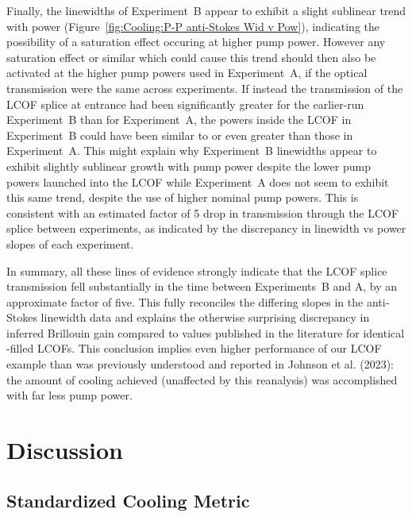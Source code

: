 Finally, the linewidths of Experiment~B appear to exhibit a slight sublinear trend with power (Figure~\ref{fig:Cooling:P-P anti-Stokes Wid v Pow}), indicating the possibility of a saturation effect occuring at higher pump power. However any saturation effect or similar which could cause this trend should then also be activated at the higher pump powers used in Experiment~A, if the optical transmission were the same across experiments. If instead the transmission of the \ac{LCOF} splice at entrance had been significantly greater for the earlier-run Experiment~B than for Experiment~A, the powers inside the \ac{LCOF} in Experiment~B could have been similar to or even greater than those in Experiment~A. This might explain why Experiment~B linewidths appear to exhibit slightly sublinear growth with pump power despite the lower pump powers launched into the \ac{LCOF} while Experiment~A does not seem to exhibit this same trend, despite the use of higher nominal pump powers. This is consistent with an estimated factor of 5 drop in transmission through the \ac{LCOF} splice between experiments, as indicated by the discrepancy in linewidth vs power slopes of each experiment.

In summary, all these lines of evidence strongly indicate that the \ac{LCOF} splice transmission fell substantially in the time between Experiments~B and A, by an approximate factor of five. This fully reconciles the differing slopes in the anti‐Stokes linewidth data and explains the otherwise surprising discrepancy in inferred Brillouin gain compared to values published in the literature for identical -filled \ac{LCOF}s. This conclusion implies even higher performance of our \ac{LCOF} example than was previously understood and reported in Johnson et al. (2023)\cite{johnson2023laser}: the amount of cooling achieved (unaffected by this reanalysis) was accomplished with far less pump power.


\section{Discussion}
\label{Cooling:sec:Discussion}

\subsection{Standardized Cooling Metric}
\label{Cooling:subsec:StandardizedCoolingMetric}

